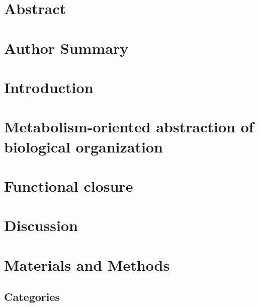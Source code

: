 





\listoftodos

\section*{Abstract}

\section*{Author Summary}

%

\section*{Introduction}


\section*{Metabolism-oriented abstraction of biological organization}


\section*{Functional closure}


\section*{Discussion}

\section*{Materials and Methods}
\subsection*{Categories}


%
